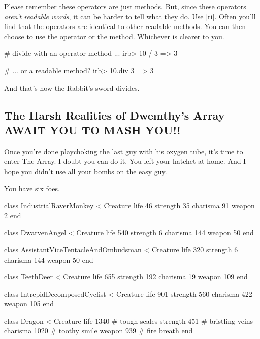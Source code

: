 \documentclass[12pt,twoside]{report}
\begin{document}
Please remember these operators are just methods.  But, since these
operators {\em aren't readable words}, it can be harder to tell what
they do.  Use \rubyinline|ri|.  Often you'll find that
the operators are identical to other readable methods.  You can then
choose to use the operator or the method. Whichever is clearer to you.


\begin{consolecode}

 # divide with an operator method ...
 irb> 10 / 3
   => 3

 # ... or a readable method?
 irb> 10.div 3
   => 3

\end{consolecode}


And that's how the Rabbit's sword divides.



\subsection{The Harsh Realities of Dwemthy's Array AWAIT YOU TO MASH YOU!!}



Once you're done playchoking the last guy with his oxygen tube, it's
time to enter The Array.  I doubt you can do it.  You left your
hatchet at home.  And I hope you didn't use all your bombs on the easy
guy.

You have six foes.


\begin{rubycode}

 class IndustrialRaverMonkey < Creature
   life 46
   strength 35
   charisma 91
   weapon 2
 end

 class DwarvenAngel < Creature
   life 540
   strength 6
   charisma 144
   weapon 50
 end

 class AssistantViceTentacleAndOmbudsman < Creature
   life 320
   strength 6
   charisma 144
   weapon 50
 end

 class TeethDeer < Creature
   life 655
   strength 192
   charisma 19
   weapon 109
 end

 class IntrepidDecomposedCyclist < Creature
   life 901
   strength 560
   charisma 422
   weapon 105
 end

 class Dragon < Creature
   life 1340     # tough scales
   strength 451  # bristling veins
   charisma 1020 # toothy smile
   weapon 939    # fire breath
 end

\end{rubycode}
\end{document}
